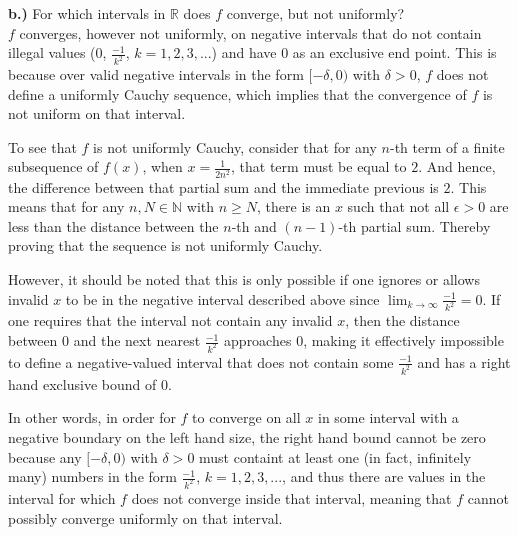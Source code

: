 \documentclass[12pt, letterpaper]{article}
\begin{document}
\noindent\textbf{b.)} For which intervals in $\mathbb{R}$ does $f$ converge, but not uniformly?\\

\noindent $f$ converges, however not uniformly, on negative intervals that do not contain illegal values (0, $\frac{-1}{k^2}$, $k = 1, 2, 3, ...$) and have 0 as an exclusive end point. This is because over valid negative intervals in the form $[-\delta, 0)$ with $\delta > 0$, $f$ does not define a uniformly Cauchy sequence, which implies that the convergence of $f$ is not uniform on that interval.
\par To see that $f$ is not uniformly Cauchy, consider that for any $n$-th term of a finite subsequence of $f(x)$, when $x = \frac{1}{2n^2}$, that term must be equal to $2$. And hence, the difference between that partial sum and the immediate previous is $2$. This means that for any $n, N \in \mathbb{N}$ with $n \geq N$, there is an $x$ such that not all $\epsilon > 0$ are less than the distance between the $n$-th and $(n-1)$-th partial sum. Thereby proving that the sequence is not uniformly Cauchy.
\par However, it should be noted that this is only possible if one ignores or allows invalid $x$ to be in the negative interval described above since $\lim_{k\to\infty} \frac{-1}{k^2} = 0$. If one requires that the interval not contain any invalid $x$, then the distance between 0 and the next nearest $\frac{-1}{k^2}$ approaches 0, making it effectively impossible to define a negative-valued interval that does not contain some $\frac{-1}{k^2}$ and has a right hand exclusive bound of $0$.
\par In other words, in order for $f$ to converge on all $x$ in some interval with a negative boundary on the left hand size, the right hand bound cannot be zero because any $[-\delta, 0)$ with $\delta > 0$ must containt at least one (in fact, infinitely many) numbers in the form $\frac{-1}{k^2}$, $k = 1, 2, 3, ...$, and thus there are values in the interval for which $f$ does not converge inside that interval, meaning that $f$ cannot possibly converge uniformly on that interval.
\end{document}
